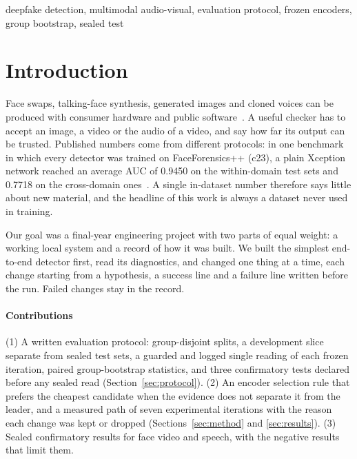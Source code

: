\documentclass[conference,a4paper]{IEEEtran_nodash}
\begin{document}
\begin{IEEEkeywords}
deepfake detection, multimodal audio-visual, evaluation protocol, frozen encoders, group
bootstrap, sealed test
\end{IEEEkeywords}

\section{Introduction}\label{sec:intro}

Face swaps, talking-face synthesis, generated images and cloned voices can be
produced with consumer hardware and public software~\cite{dolhansky2020dfdc}. A
useful checker has to accept an image, a video or the audio of a video, and say
how far its output can be trusted. Published numbers come from different
protocols: in one benchmark in which every detector was trained on
FaceForensics++ (c23), a plain Xception network reached an average AUC of 0.9450
on the within-domain test sets and 0.7718 on the cross-domain
ones~\cite{yan2023deepfakebench}. %
A single in-dataset number therefore says little about new material, and the
headline of this work is always a dataset never used in training.

Our goal was a final-year engineering project with two parts of equal weight: a
working local system and a record of how it was built. We built the simplest
end-to-end detector first, read its diagnostics, and changed one thing at a time,
each change starting from a hypothesis, a success line and a failure line written
before the run. Failed changes stay in the record.

\paragraph*{Contributions}
(1) A written evaluation protocol: group-disjoint splits, a development slice
separate from sealed test sets, a guarded and logged single reading of each
frozen iteration, paired group-bootstrap statistics, and three confirmatory tests
declared before any sealed read (Section~\ref{sec:protocol}). (2) An encoder
selection rule that prefers the cheapest candidate when the evidence does not
separate it from the leader, and a measured path of seven experimental iterations
with the reason each change was kept or dropped (Sections~\ref{sec:method} and
\ref{sec:results}). (3) Sealed confirmatory results for face video and speech,
with the negative results that limit them.
\end{document}
